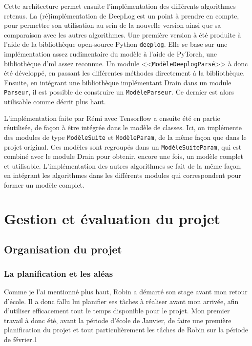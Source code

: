 \documentclass[openany, 11pt]{memoir}
\begin{document}
\bigskip
Cette architecture permet ensuite l'implémentation des différents algorithmes retenus. La (ré)\-implémentation de DeepLog est un point à prendre en compte, pour permettre son utilisation au sein de la nouvelle version ainsi que sa comparaison avec les autres algorithmes. Une première version à été produite à l'aide de la bibliothèque open-source Python \texttt{deeplog}. Elle se base sur une implémentation assez rudimentaire du modèle à l'aide de PyTorch, une bibliothèque d'\gls{ml} assez reconnue. Un module <<\texttt{ModèleDeeplogParsé}>> à donc été développé, en passant les différentes méthodes directement à la bibliothèque. Ensuite, en intégrant une bibliothèque implémentant Drain dans un module \texttt{Parseur}, il est possible de construire un \texttt{ModèleParseur}. Ce dernier est alors utilisable comme décrit plus haut.

L'implémentation faite par Rémi avec Tensorflow a ensuite été en partie réutilisée, de façon à être intégrée dans le modèle de classes. Ici, on implémente des modules de type \texttt{ModèleSuite} et \texttt{ModèleParam}, de la même façon que dans le projet original. Ces modèles sont regroupés dans un \texttt{ModèleSuiteParam}, qui est combiné avec le module Drain pour obtenir, encore une fois, un modèle complet et utilisable. L'implémentation des autres algorithmes se fait de la même façon, en intégrant les algorithmes dans les différents modules qui correspondent pour former un modèle complet.

\newpage
\chapter{Gestion et évaluation du projet}

\section{Organisation du projet}

\subsection{La planification et les aléas}

Comme je l'ai mentionné plus haut, Robin a démarré son stage avant mon retour d'école. Il a donc fallu lui planifier ses tâches à réaliser avant mon arrivée, afin d'utiliser efficacement tout le temps disponible pour le projet. Mon premier travail à donc été, avant la période d'école de Janvier, de faire une première planification du projet et tout particulièrement les tâches de Robin sur la période de février.1
\end{document}
